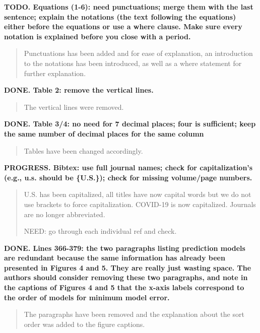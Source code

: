 


\newcommand{\REVIEW}[3]{
  \begin{tcolorbox}[colback={#1}]
    {\bf {#1}. {#2}}
 \end{tcolorbox}
  \begin{quote}
    {#3}
  \end{quote}
}


\REVIEW{TODO}{Equations (1-6): need punctuations; merge them with the last sentence; explain the notations (the text following the equations) either before the equations or use a where clause. Make sure every notation is explained before you close with a period.}{Punctuations has been added and for ease of explanation, an introduction to the notations has been introduced, as well as a where statement for further explanation.}

\REVIEW{DONE}{Table 2: remove the vertical lines.}{The vertical lines were removed.}

\REVIEW{DONE}{Table 3/4: no need for 7 decimal places; four is sufficient; keep the same number of decimal places for the same column}
{Tables have been changed accordingly.}

\REVIEW{PROGRESS}{Bibtex: use full journal names; check for capitalization's (e.g., u.s. should be \{U.S.\}); check for missing volume/page numbers.}{U.S. has been capitalized, all titles have now capital words but we do not use brackets to force capitalization. COVID-19 is now capitalized. Journals are no longer abbreviated.

NEED: go through each individual ref and check.}

\REVIEW{DONE}{Lines 366-379: the two paragraphs listing prediction models are redundant because the same information has already been presented in Figures 4 and 5. They are really just wasting space. The authors should consider removing these two paragraphs, and note in the captions of Figures 4 and 5 that the x-axis labels correspond to the order of models for minimum model error.}{The paragraphs have been removed and the explanation about the sort order was added to the figure captions.}
